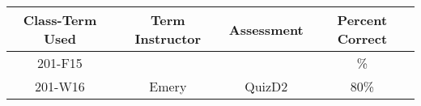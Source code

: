 \begin{outcomes}
	\begin{center}
		\begin{tabular}{cccc}
			\hline\hline
			Class-Term Used & Term Instructor & Assessment & Percent Correct\\
			\hline
			201-F15 &  &  & \%\\    %
			201-W16 & Emery & QuizD2 & 80\%\\    %
			\hline
		\end{tabular}
	\end{center}
\end{outcomes}

\begin{comments}
	
\end{comments}
